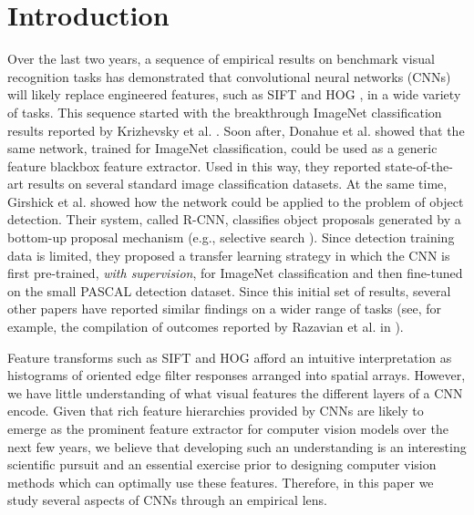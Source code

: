 \section{Introduction}

Over the last two years, a sequence of empirical results on benchmark visual recognition tasks has demonstrated that convolutional neural networks (CNNs) \cite{fukushima1980neocognitron,Lecun89,rumelhart86} will likely replace engineered features, such as SIFT \cite{Sift} and HOG \cite{Hog}, in a wide variety of tasks.
This sequence started with the breakthrough ImageNet classification results reported by Krizhevsky et al. \cite{Kriz}.
Soon after, Donahue et al. \cite{Decaf} showed that the same network, trained for ImageNet classification, could be used as a generic feature blackbox feature extractor.
Used in this way, they reported state-of-the-art results on several standard image classification datasets.
At the same time, Girshick et al. \cite{Rcnn} showed how the network could be applied to the problem of object detection.
Their system, called R-CNN, classifies object proposals generated by a bottom-up proposal mechanism (e.g., selective search \cite{UijlingsIJCV2013}).
Since detection training data is limited, they proposed a transfer learning strategy in which the CNN is first pre-trained, \emph{with supervision}, for ImageNet classification and then fine-tuned on the small PASCAL detection dataset.
Since this initial set of results, several other papers have reported similar findings on a wider range of tasks (see, for example, the compilation of outcomes reported by Razavian et al. in \cite{astounding}).

Feature transforms such as SIFT and HOG afford an intuitive interpretation as histograms of oriented edge filter responses arranged into spatial arrays.
However, we have little understanding of what visual features the different layers of a CNN encode.
Given that rich feature hierarchies provided by CNNs are likely to emerge as the prominent feature extractor for computer vision models over the next few years, we believe that developing such an understanding is an interesting scientific pursuit and an essential exercise prior to designing computer vision methods which can optimally use these features.
Therefore, in this paper we study several aspects of CNNs through an empirical lens.

